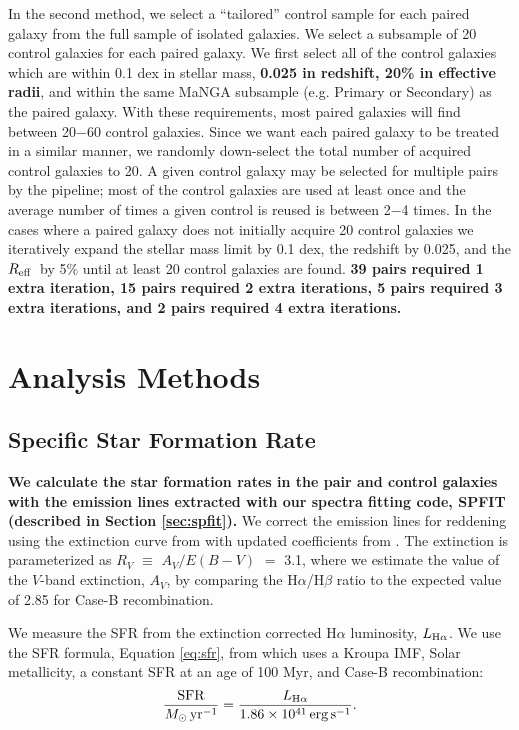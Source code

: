 \documentclass[iop,revtex4,twocolumn,apj,numberedappendix,appendixfloats]{emulateapj}
\newcommand{\reff}{$R_{\rm eff}$}
\begin{document}
In the second method, we select a ``tailored'' control sample for each paired galaxy from the full sample of isolated galaxies. We select a subsample of 20 control galaxies for each paired galaxy. We first select all of the control galaxies which are within 0.1 dex in stellar mass, \textbf{0.025 in redshift, 20\% in effective radii}, and within the same MaNGA subsample (e.g. Primary or Secondary) as the paired galaxy. With these requirements, most paired galaxies will find between 20$-$60 control galaxies. Since we want each paired galaxy to be treated in a similar manner, we randomly down-select the total number of acquired control galaxies to 20. A given control galaxy may be selected for multiple pairs by the pipeline; most of the control galaxies are used at least once and the average number of times a given control is reused is between 2$-$4 times. In the cases where a paired galaxy does not initially acquire 20 control galaxies we iteratively expand the stellar mass limit by 0.1 dex, the redshift by 0.025, and the \reff\ by 5\% until at least 20 control galaxies are found. \textbf{39 pairs required 1 extra iteration, 15 pairs required 2 extra iterations, 5 pairs required 3 extra iterations, and 2 pairs required 4 extra iterations. }

\section{Analysis Methods}\label{sec:analysis}

\subsection{Specific Star Formation Rate}
\textbf{We calculate the star formation rates in the pair and control galaxies with the emission lines extracted with our spectra fitting code, {\sc SPFIT} (described in Section \ref{sec:spfit}).} We correct the emission lines for reddening using the extinction curve from \citet{Cardelli:1989} with updated coefficients from \citet{ODonnell:1994}. The extinction is parameterized as $R_V$ $\equiv$ $A_V/E(B-V)$ $=$ 3.1, where we estimate the value of the $V$-band extinction, $A_V$, by comparing the H$\alpha$/H$\beta$ ratio to the expected value of 2.85 for Case-B recombination. 

We measure the SFR from the extinction corrected H$\alpha$ luminosity, $L_{{\rm H}\alpha}$. We use the SFR formula, Equation \ref{eq:sfr}, from \citet{Murphy:2011} which uses a Kroupa IMF, Solar metallicity, a constant SFR at an age of 100 Myr, and Case-B recombination: 
\begin{equation}\label{eq:sfr}
\frac{\rm{SFR}}{M_{\odot} \, \rm{yr^{-1}}} = \frac{L_{\rm H\alpha}}{1.86 \times 10^{41}\, \rm{erg\,s}^{-1}}.
\end{equation}
\end{document}
